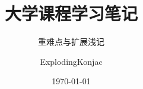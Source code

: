 \documentclass{note}
\title{大学课程学习笔记}
\subtitle{重难点与扩展浅记}
\author{ExplodingKonjac}
\date{\today}
\begin{document}
\begin{titlingpage}
	\maketitle
\end{titlingpage}

\tableofcontents


\end{document}
